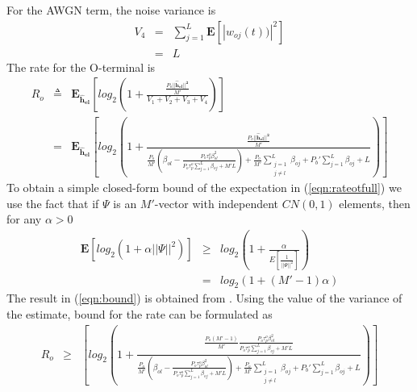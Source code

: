 \documentclass[10pt, a4paper, twoside,fleqn]{article}
\begin{document}
For the AWGN term, the noise variance is 
\begin{eqnarray}
	V_4 &=& \sum\limits_{j=1}^{L}\mathbf{E}[|w_{oj}(t))|^2] \nonumber \\
            &=& L
\end{eqnarray}
The rate for the O-terminal is
\begin{eqnarray}\label{eqn:rateotfull}
	R_o &\triangleq& \mathbf{E_{\hat h_{el}}}\left[log_2\left(1+\frac{\frac{P_o||\mathbf{\hat h_{el}||^2}}{M'}}{V_1+V_2+V_3+V_4}\right) \right] \nonumber \\
            &=&  \mathbf{E_{\hat h_{el}}}\left[log_2\left(1+\frac{\frac{P_o||\mathbf{\hat h_{el}||^2}}{M'}}
								 {\frac{P_o}{M'}(\beta_{ol}-\frac{P_o\tau_p^o\beta^2_{ol}}{P_o\tau_p^o\sum_{j=1}^{L}\beta_{oj}+M'L})        
								  + \frac{P_o}{M'} \sum_{\substack{j=1 \\ j\neq l}}^{L} \beta_{oj} 
								  +P_b'\sum_{j=1}^{L}\beta_{oj}
								  +L}\right) \right]	
\end{eqnarray}
To obtain a simple closed-form bound of the expectation in (\ref{eqn:rateotfull}) we use the fact that if $\Psi$ is an $M'$-vector with independent $CN(0,1)$ elements, then for any $\alpha>0$
\begin{eqnarray}\label{eqn:bound}
	\mathbf{E}[log_2(1+\alpha||\Psi||^2)] &\geq& log_2\left(1+\frac{\alpha}{E[\frac{1}{||\Psi||^2}]}\right) \nonumber \\
                                              &=&  log_2(1+(M'-1)\alpha)
\end{eqnarray}
The result in (\ref{eqn:bound}) is obtained from \cite{bib:dtsysBook}. Using the value of the variance of the estimate, bound for the rate can be formulated as
\begin{eqnarray}
	R_o &\geq& \left[log_2\left(1+\frac{\frac{P_o(M'-1)}{M'}\frac{P_o\tau_p^o\beta^2_{ol}}{P_o\tau_p^o\sum_{j=1}^{L}\beta_{oj}+M'L}}
								 {\frac{P_o}{M'}(\beta_{ol}-\frac{P_o\tau_p^o\beta^2_{ol}}{P_o\tau_p^o\sum_{j=1}^{L}\beta_{oj}+M'L})        
								  + \frac{P_o}{M'} \sum_{\substack{j=1 \\ j\neq l}}^{L} \beta_{oj} 
								  +P_b'\sum_{j=1}^{L}\beta_{oj}
								  +L}\right) \right]	
\end{eqnarray}
\end{document}
